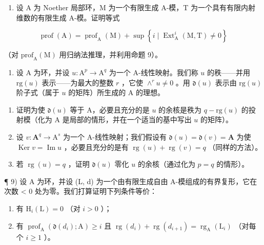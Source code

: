 \begin{enumerate}
\def\labelenumi{\arabic{enumi})}
\setcounter{enumi}{6}
\tightlist
\item
  设 A 为 Noether 局部环，M 为一个有限生成 A-模，T 为一个具有有限内射维数的有限生成 A-模。证明等式
\end{enumerate}

\[
\operatorname{prof} (\mathrm{A}) = \operatorname{prof} _ {\mathrm{A}} (\mathrm{M}) + \sup \left\{i \mid \operatorname{Ext} _ {\mathrm{A}} ^ {i} (\mathrm{M}, \mathrm{T}) \neq 0 \right\}
\]

（对 \(\mathrm{prof}_{\mathrm{A}}(\mathrm{M})\) 用归纳法推理，并利用命题 9）。

\begin{enumerate}
\def\labelenumi{\arabic{enumi})}
\setcounter{enumi}{7}
\tightlist
\item
  设 A 为环，并设 \(u: \mathrm{A}^p \to \mathrm{A}^q\) 为一个 A-线性映射。我们称 \(u\) 的秩——并用 \(\text{rg}(u)\) 表示——为最大的整数 \(r\) ，它使 \(\wedge^r u \neq 0\) 。用 \(\mathfrak{d}(u)\) 表示由 \(\text{rg}(u)\) 阶子式（属于 \(u\) 的矩阵）所生成的 A 的理想。
\end{enumerate}

\begin{enumerate}
\def\labelenumi{\alph{enumi})}
\item
  证明为使 \(\mathfrak{d}(u)\) 等于 A，必要且充分的是 \(u\) 的余核是秩为 \(q - \mathrm{rg}(u)\) 的投射模（化为 \(\mathrm{A}\) 是局部的情形，并在一个适当的基中写出 \(u\) 的矩阵）。
\item
  设 \(v: \mathbf{A}^q \to \mathrm{A}^s\) 为一个 A-线性映射；我们假设有 \(\mathfrak{d}(u) = \mathfrak{d}(v) = \mathbf{A}\) 为使 \(\operatorname{Ker} v = \operatorname{Im} u\) ，必要且充分的是有 \(\operatorname{rg}(u) + \operatorname{rg}(v) = q\) （同样的方法）。
\item
  若 \(\operatorname{rg}(u) = q\) ，证明 \(\mathfrak{d}(u)\) 零化 \(u\) 的余核（通过化为 \(p = q\) 的情形）。
\end{enumerate}

¶ 9) 设 A 为环，并设 (L, d) 为一个由有限生成自由 A-模组成的有界复形，它在次数 \textless{} 0 处为零。我们打算证明下列条件等价：

\begin{enumerate}
\def\labelenumi{(\roman{enumi})}
\item
  有 \(\mathrm{H}_i(\mathrm{L}) = 0\) （对 \(i > 0\) ）；
\item
  有 \(\operatorname{prof}_{\mathrm{A}}(\mathfrak{d}(d_i); \mathrm{A}) \geqslant i\) 且 \(\operatorname{rg}(d_i) + \operatorname{rg}(d_{i+1}) = \operatorname{rg}_{\mathrm{A}}(\mathrm{L}_i)\) （对每个 \(i \geqslant 1\) ）。
\end{enumerate}


